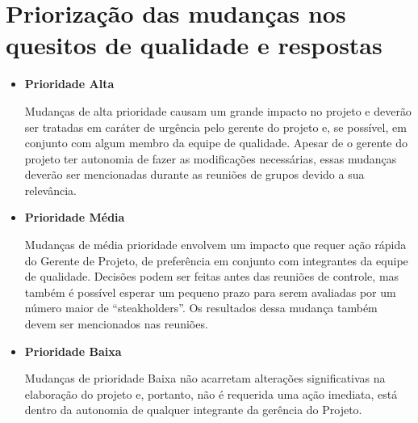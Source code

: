 \section*{Priorização das mudanças nos quesitos de qualidade e respostas}
\begin{itemize}
\item  \textbf{Prioridade Alta}

	Mudanças de alta prioridade causam um grande impacto no projeto e deverão ser tratadas em caráter de urgência pelo gerente do projeto e, se possível, em conjunto com algum membro da equipe de qualidade. Apesar de o gerente do projeto ter autonomia de fazer as modificações necessárias, essas mudanças deverão ser mencionadas durante as reuniões de grupos devido a sua relevância. 
        
        
\item  \textbf{Prioridade Média}

	Mudanças de média prioridade envolvem um impacto que requer ação rápida do Gerente de Projeto, de preferência em conjunto com integrantes da equipe de qualidade. Decisões podem ser feitas antes das reuniões de controle, mas também é possível esperar um pequeno prazo para serem avaliadas por um número maior de “steakholders”. Os resultados dessa mudança também devem ser mencionados nas reuniões.
        
\item  \textbf{Prioridade Baixa}

	Mudanças de prioridade Baixa não acarretam alterações significativas na elaboração do projeto e, portanto, não é requerida uma ação imediata, está dentro da autonomia de qualquer integrante da gerência do Projeto.
\end{itemize}

